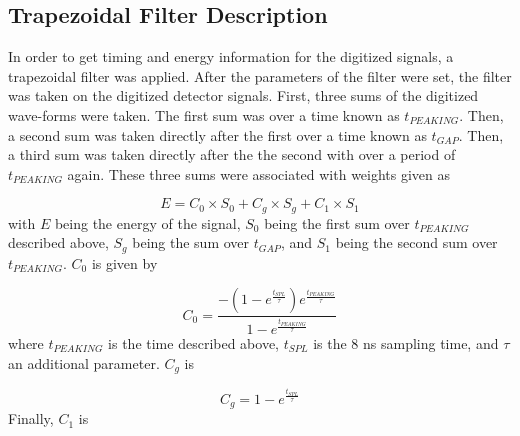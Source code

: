 \documentclass[../MaxHughesThesis.tex]{subfiles}
\begin{document}
\subsection{Trapezoidal Filter Description}
In order to get timing and energy information for the digitized signals, a trapezoidal filter was applied.
After the parameters of the filter were set, the filter was taken on the digitized detector signals.
First, three sums of the digitized wave-forms were taken.
The first sum was over a time known as $t_{PEAKING}$.
Then, a second sum was taken directly after the first over a time known as $t_{GAP}$.
Then, a third sum was taken directly after the the second with over a period of $t_{PEAKING}$ again.
These three sums were associated with weights given as \cite{Tan03} 

\begin{equation}
	E = C_{0} \times S_{0} + C_{g} \times S_{g} + C_{1} \times S_{1} 
	\label{eq:ensum}
\end{equation} 
%
with $E$ being the energy of the signal, $S_{0}$ being the first sum over $t_{PEAKING}$ described above, $S_{g}$ being the sum over $t_{GAP}$, and $S_{1}$ being the second sum over $t_{PEAKING}$.
$C_{0}$ is given by 

\begin{equation}
	C_{0} = \frac{-(1 - e^{\frac{t_{SPL}}{\tau}})e^{\frac{t_{PEAKING}}{\tau}}}{1 - e^{\frac{t_{PEAKING}}{\tau}}}
	\label{eq:c0sum}
\end{equation}
%
where $t_{PEAKING}$ is the time described above, $t_{SPL}$ is the 8 ns sampling time, and $\tau$ an additional parameter.
$C_{g}$ is 

\begin{equation}
	C_{g} = 1 - e^{\frac{t_{SPL}}{\tau}}
	\label{eq:cgsum}
\end{equation}
%
Finally, $C_{1}$ is 
\end{document}
